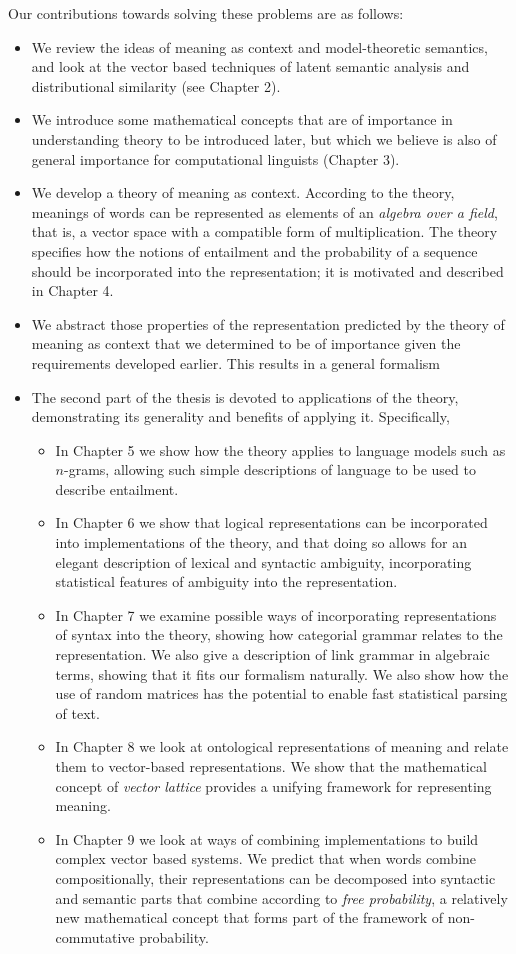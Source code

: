 \documentclass[12pt]{report}
\begin{document}
Our contributions towards solving these problems are as follows:
\begin{itemize}
\item We review the ideas of meaning as context and model-theoretic semantics, and look at the vector based techniques of latent semantic analysis and distributional similarity (see Chapter 2).
\item We introduce some mathematical concepts that are of importance in understanding theory to be introduced later, but which we believe is also of general importance for computational linguists (Chapter 3).
\item We develop a theory of meaning as context. According to the theory, meanings of words can be represented as elements of an \emph{algebra over a field}, that is, a vector space with a compatible form of multiplication. The theory specifies how the notions of entailment and the probability of a sequence should be incorporated into the representation; it is motivated and described in Chapter 4.
\item We abstract those properties of the representation predicted by the theory of meaning as context that we determined to be of importance given the requirements developed earlier. This results in a general formalism
\item The second part of the thesis is devoted to applications of the theory, demonstrating its generality and benefits of applying it. Specifically,
\begin{itemize}
\item In Chapter 5 we show how the theory applies to language models such as $n$-grams, allowing such simple descriptions of language to be used to describe entailment.
\item In Chapter 6 we show that logical representations can be incorporated into implementations of the theory, and that doing so allows for an elegant description of lexical and syntactic ambiguity, incorporating statistical features of ambiguity into the representation.
\item In Chapter 7 we examine possible ways of incorporating representations of syntax into the theory, showing how categorial grammar relates to the representation. We also give a description of link grammar in algebraic terms, showing that it fits our formalism naturally. We also show how the use of random matrices has the potential to enable fast statistical parsing of text.
\item In Chapter 8 we look at ontological representations of meaning and relate them to vector-based representations. We show that the mathematical concept of \emph{vector lattice} provides a unifying framework for representing meaning.
\item In Chapter 9 we look at ways of combining implementations to build complex vector based systems. We predict that when words combine compositionally, their representations can be decomposed into syntactic and semantic parts that combine according to \emph{free probability}, a relatively new mathematical concept that forms part of the framework of non-commutative probability.
\end{itemize}
\end{itemize}
\end{document}
